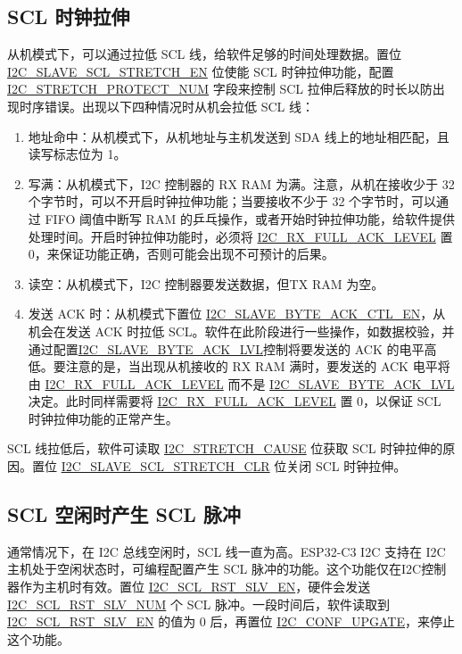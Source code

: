 \documentclass[main\_\_CN.tex]{subfiles}
\begin{document}
\subsection{SCL 时钟拉伸}
从机模式下，可以通过拉低 SCL 线，给软件足够的时间处理数据。置位 \hyperref[fielddesc:I2CSLAVESCLSTRETCHEN]{I2C\_SLAVE\_SCL\_STRETCH\_EN} 位使能 SCL 时钟拉伸功能，配置 \hyperref[fielddesc:I2CSTRETCHPROTECTNUM]{I2C\_STRETCH\_PROTECT\_NUM} 字段来控制 SCL 拉伸后释放的时长以防出现时序错误。出现以下四种情况时从机会拉低 SCL 线：

\begin{enumerate}
\item 地址命中：从机模式下，从机地址与主机发送到 SDA 线上的地址相匹配，且读写标志位为 1。
\item 写满：从机模式下，I2C 控制器的 RX RAM 为满。注意，从机在接收少于 32 个字节时，可以不开启时钟拉伸功能；当要接收不少于 32 个字节时，可以通过 FIFO 阈值中断写 RAM 的乒乓操作，或者开始时钟拉伸功能，给软件提供处理时间。开启时钟拉伸功能时，必须将 \hyperref[fielddesc:I2CRXFULLACKLEVEL]{I2C\_RX\_FULL\_ACK\_LEVEL} 置 0，来保证功能正确，否则可能会出现不可预计的后果。
\item 读空：从机模式下，I2C 控制器要发送数据，但TX RAM 为空。
\item 发送 ACK 时：从机模式下置位 \hyperref[fielddesc:I2CSLAVEBYTEACKCTLEN]{I2C\_SLAVE\_BYTE\_ACK\_CTL\_EN}，从机会在发送 ACK 时拉低 SCL。软件在此阶段进行一些操作，如数据校验，并通过配置\hyperref[fielddesc:I2CSLAVEBYTEACKLVL]{I2C\_SLAVE\_BYTE\_ACK\_LVL}控制将要发送的 ACK 的电平高低。要注意的是，当出现从机接收的 RX RAM 满时，要发送的 ACK 电平将由 \hyperref[fielddesc:I2CRXFULLACKLEVEL]{I2C\_RX\_FULL\_ACK\_LEVEL} 而不是 \hyperref[fielddesc:I2CSLAVEBYTEACKLVL]{I2C\_SLAVE\_BYTE\_ACK\_LVL} 决定。此时同样需要将 \hyperref[fielddesc:I2CRXFULLACKLEVEL]{I2C\_RX\_FULL\_ACK\_LEVEL} 置 0，以保证 SCL 时钟拉伸功能的正常产生。
\end{enumerate}

SCL 线拉低后，软件可读取 \hyperref[fielddesc:I2CSTRETCHCAUSE]{I2C\_STRETCH\_CAUSE} 位获取 SCL 时钟拉伸的原因。置位 \hyperref[fielddesc:I2CSLAVESCLSTRETCHCLR]{I2C\_SLAVE\_SCL\_STRETCH\_CLR} 位关闭 SCL 时钟拉伸。

\subsection{SCL 空闲时产生 SCL 脉冲}
通常情况下，在 I2C 总线空闲时，SCL 线一直为高。ESP32-C3 I2C 支持在 I2C 主机处于空闲状态时，可编程配置产生 SCL 脉冲的功能。这个功能仅在I2C控制器作为主机时有效。置位 \hyperref[fielddesc:I2CSCLRSTSLVEN]{I2C\_SCL\_RST\_SLV\_EN}，硬件会发送 \hyperref[fielddesc:I2CSCLRSTSLVNUM]{I2C\_SCL\_RST\_SLV\_NUM} 个 SCL 脉冲。一段时间后，软件读取到\hyperref[fielddesc:I2CSCLRSTSLVEN]{I2C\_SCL\_RST\_SLV\_EN} 的值为 0 后，再置位 \hyperref[fielddesc:I2CCONFUPGATE]{I2C\_CONF\_UPGATE}，来停止这个功能。
\end{document}
